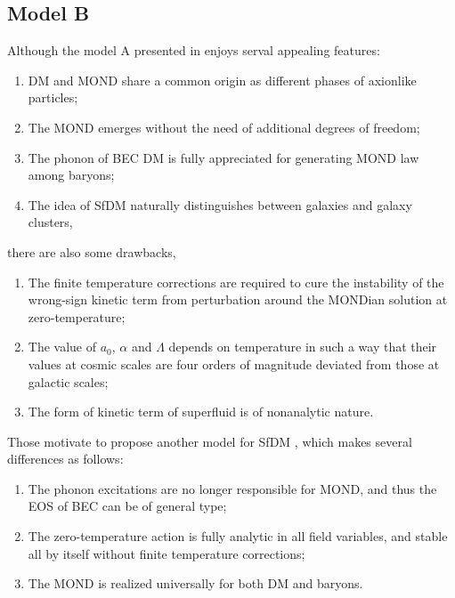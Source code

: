 \documentclass[aps,prd,twocolumn,10pt,groupedaddress]{revtex4-1}
\begin{document}
\subsection{Model B} \label{subsec:model2}

Although the model A presented in \cite{Berezhiani:2015bqa} enjoys serval appealing features:
\begin{enumerate}
  \item DM and MOND share a common origin as different phases of axionlike particles;
  \item The MOND  emerges without the need of additional degrees of freedom;
  \item The phonon of BEC DM is fully appreciated for generating MOND law among baryons;
  \item The idea of SfDM naturally distinguishes between galaxies and galaxy clusters,
\end{enumerate}
there are also some drawbacks,
\begin{enumerate}
  \item The finite temperature corrections are required to cure the instability of the wrong-sign kinetic term from perturbation around the MONDian solution at zero-temperature;
  \item The value of $a_0$, $\alpha$ and $\Lambda$ depends on temperature in such a way that their values at cosmic scales are four orders of magnitude deviated from those at galactic scales;
  \item The form of kinetic term of superfluid is of nonanalytic nature.
\end{enumerate}
Those motivate to propose another model for SfDM  \cite{Khoury:2016ehj}, which makes several differences as follows:
\begin{enumerate}
  \item The phonon excitations are no longer responsible for MOND, and thus the EOS of BEC can be of general type;
  \item The zero-temperature action is fully analytic in all field variables, and stable all by itself without finite temperature corrections;
  \item The MOND is realized universally for both DM and baryons.
\end{enumerate}
\end{document}
